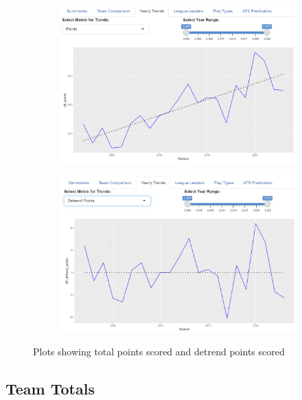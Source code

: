 \documentclass{article}
\begin{document}
\begin{figure}[H]
    \centering
    \begin{subfigure}{0.45\textwidth}
        \centering
        \includegraphics[width=\textwidth]{../screenshots/stat-trend.png}
    \end{subfigure}\hfill
    \begin{subfigure}{0.45\textwidth}
        \centering
        \includegraphics[width=\textwidth]{../screenshots/stat-detrend.png}
    \end{subfigure}\hfill
    \caption{Plots showing total points scored and detrend points scored}
\end{figure}

\subsection{Team Totals}
\end{document}
